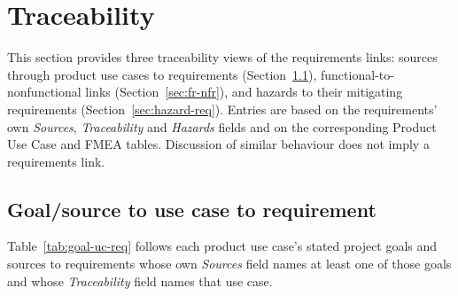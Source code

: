 \documentclass[12pt]{article}
\renewcommand{\_}{\textunderscore\allowbreak}%
\begin{document}
\section{Traceability}
\label{sec:traceability}

This section provides three traceability views of the requirements links:
sources through product use cases to requirements
(Section~\ref{sec:goal-uc-req}), functional-to-nonfunctional links
(Section~\ref{sec:fr-nfr}), and hazards to their mitigating requirements
(Section~\ref{sec:hazard-req}). Entries are based on the requirements' own
\emph{Sources}, \emph{Traceability} and \emph{Hazards} fields and on the
corresponding Product Use Case and FMEA tables. Discussion of similar behaviour
does not imply a requirements link.

\subsection{Goal/source to use case to requirement}
\label{sec:goal-uc-req}

Table~\ref{tab:goal-uc-req} follows each product use case's stated project goals
and sources to requirements whose own \emph{Sources} field names at least one of
those goals and whose \emph{Traceability} field names that use case.
\end{document}
